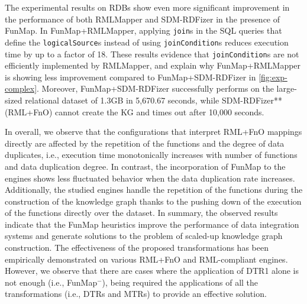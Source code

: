 The experimental results on RDBs show even more significant improvement in the performance of both RMLMapper and SDM-RDFizer in the presence of FunMap. In FunMap+RMLMapper, applying \verb|join|s in the SQL queries that define the \verb|logicalSource|s instead of using \verb|joinCondition|s reduces execution time by up to a factor of 18. These results evidence that \verb|joinCondition|s are not efficiently implemented by RMLMapper, and explain why FunMap+RMLMapper is showing less improvement compared to FunMap+SDM-RDFizer in \autoref{fig:exp-complex}. Moreover, FunMap+SDM-RDFizer successfully performs on the large-sized relational dataset of 1.3GB in 5,670.67 seconds, while SDM-RDFizer**(RML+FnO) cannot create the KG and times out after 10,000 seconds.

In overall, we observe that the configurations that interpret RML+FnO mappings directly are affected by the repetition of the functions and the degree of data duplicates, i.e., execution time monotonically increases with number of functions and data duplication degree. In contrast, the incorporation of FunMap to the engines shows less fluctuated behavior when the data duplication rate increases. Additionally, the studied engines handle the repetition of the functions during the construction of the knowledge graph thanks to the pushing down of the execution of the functions directly over the dataset.
In summary, the observed results indicate that the FunMap heuristics improve the performance of data integration systems and generate solutions to the problem of scaled-up knowledge graph construction. The effectiveness of the proposed transformations has been empirically demonstrated on various RML+FnO and RML-compliant engines. However, we observe that there are cases where the application of DTR1 alone is not enough (i.e., FunMap$^-$), being required the applications of all the transformations (i.e., DTRs and MTRs) to provide an effective solution. 


